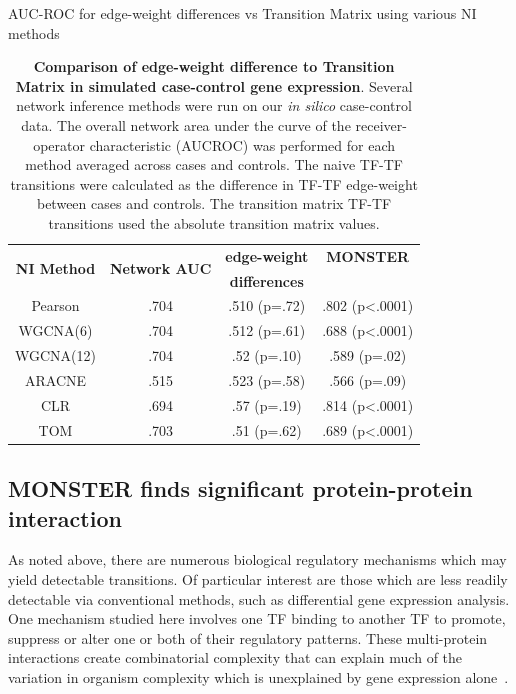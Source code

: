\documentclass[9pt,twocolumn,twoside]{pnas-new}
\begin{document}
{\tiny

\begin{table}
AUC-ROC for edge-weight differences vs Transition Matrix using various
NI methods\\
\begin{tabular}{|cc||c|c|}
\hline
\multirow{2}{*}{\textbf{NI Method}} & \multirow{2}{*}{\textbf{Network AUC}} & \textbf{edge-weight } & \textbf{MONSTER}\tabularnewline
 &  & \textbf{differences} & \tabularnewline
\hline 
Pearson & .704 & .510 (p=.72) & .802 (p<.0001)\tabularnewline
\hline 
WGCNA(6) & .704 & .512 (p=.61) & .688 (p<.0001)\tabularnewline
\hline 
WGCNA(12) & .704 & .52 (p=.10) & .589 (p=.02)\tabularnewline
\hline 
ARACNE & .515 & .523 (p=.58) & .566 (p=.09)\tabularnewline
\hline 
CLR & .694 & .57 (p=.19) & .814 (p<.0001)\tabularnewline
\hline 
TOM & .703 & .51 (p=.62) & .689 (p<.0001)\tabularnewline
\hline 
\end{tabular}\caption{\textbf{Comparison of edge-weight difference to Transition Matrix
in simulated case-control gene expression}. Several network inference
methods were run on our \emph{in silico} case-control data. The overall
network area under the curve of the receiver-operator characteristic
(AUCROC) was performed for each method averaged across cases and
controls. The naive TF-TF transitions were calculated as the difference
in TF-TF edge-weight between cases and controls. The transition matrix
TF-TF transitions used the absolute transition matrix values. }
\end{table}

}

\subsection*{MONSTER finds significant protein-protein interaction}

As noted above, there are numerous biological regulatory mechanisms
which may yield detectable transitions. Of particular interest are
those which are less readily detectable via conventional methods,
such as differential gene expression analysis. One mechanism studied
here involves one TF binding to another TF to promote, suppress or
alter one or both of their regulatory patterns. These multi-protein
interactions create combinatorial complexity that can explain much
of the variation in organism complexity which is unexplained by gene
expression alone~\cite{levine2003transcription}.
\end{document}
